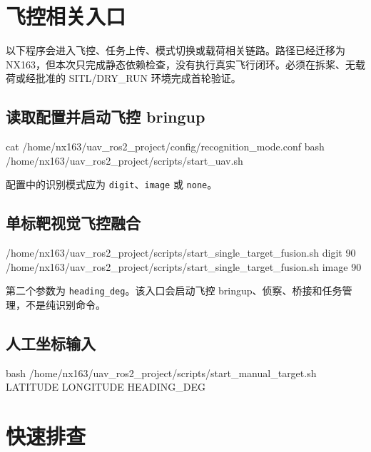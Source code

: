 \documentclass[11pt,a4paper]{article}
\begin{document}
\Needspace{92mm}
\section{飞控相关入口}

\begin{dangerbox}[title={\bfseries 受控测试区命令}]
以下程序会进入飞控、任务上传、模式切换或载荷相关链路。路径已经迁移为 NX163，但本次只完成静态依赖检查，没有执行真实飞行闭环。必须在拆桨、无载荷或经批准的 SITL/DRY\_RUN 环境完成首轮验证。
\end{dangerbox}

\subsection{读取配置并启动飞控 bringup}
\begin{commandbox}
cat /home/nx163/uav_ros2_project/config/recognition_mode.conf
bash /home/nx163/uav_ros2_project/scripts/start_uav.sh
\end{commandbox}

配置中的识别模式应为 \texttt{digit}、\texttt{image} 或 \texttt{none}。

\subsection{单标靶视觉飞控融合}
\begin{commandbox}
/home/nx163/uav_ros2_project/scripts/start_single_target_fusion.sh digit 90
/home/nx163/uav_ros2_project/scripts/start_single_target_fusion.sh image 90
\end{commandbox}

第二个参数为 \texttt{heading\_deg}。该入口会启动飞控 bringup、侦察、桥接和任务管理，不是纯识别命令。

\subsection{人工坐标输入}
\begin{commandbox}
bash /home/nx163/uav_ros2_project/scripts/start_manual_target.sh LATITUDE LONGITUDE HEADING_DEG
\end{commandbox}

\section{快速排查}
\end{document}
